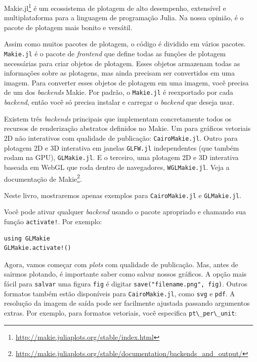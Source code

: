 \documentclass[
  notoc %
]{tufte-book}
\DeclareRobustCommand{\href}[2]{#2\footnote{\url{#1}}}
\newcommand{\passthrough}[1]{#1}
\begin{document}
\href{http://makie.juliaplots.org/stable/index.html}{Makie.jl} é um
ecossistema de plotagem de alto desempenho, extensível e multiplataforma
para a linguagem de programação Julia. Na nossa opinião, é o pacote de
plotagem mais bonito e versátil.

Assim como muitos pacotes de plotagem, o código é dividido em vários
pacotes. \passthrough{\lstinline!Makie.jl!} é o pacote de
\emph{frontend} que define todas as funções de plotagem necessárias para
criar objetos de plotagem. Esses objetos armazenam todas as informações
sobre as plotagens, mas ainda precisam ser convertidos em uma imagem.
Para converter esses objetos de plotagem em uma imagem, você precisa de
um dos \emph{backends} Makie. Por padrão, o
\passthrough{\lstinline!Makie.jl!} é reexportado por cada
\emph{backend}, então você só precisa instalar e carregar o
\emph{backend} que deseja usar.

Existem três \emph{backends} principais que implementam concretamente
todos os recursos de renderização abstratos definidos no Makie. Um para
gráficos vetoriais 2D não interativos com qualidade de publicação:
\passthrough{\lstinline!CairoMakie.jl!}. Outro para plotagem 2D e 3D
interativa em janelas \passthrough{\lstinline!GLFW.jl!} independentes
(que também rodam na GPU), \passthrough{\lstinline!GLMakie.jl!}. E o
terceiro, uma plotagem 2D e 3D interativa baseada em WebGL que roda
dentro de navegadores, \passthrough{\lstinline!WGLMakie.jl!}.
\href{http://makie.juliaplots.org/stable/documentation/backends_and_output/}{Veja
a documentação de Makie}.

Neste livro, mostraremos apenas exemplos para
\passthrough{\lstinline!CairoMakie.jl!} e
\passthrough{\lstinline!GLMakie.jl!}.

Você pode ativar qualquer \emph{backend} usando o pacote apropriado e
chamando sua função \passthrough{\lstinline"activate!"}. Por exemplo:

\begin{lstlisting}
using GLMakie
GLMakie.activate!()
\end{lstlisting}

Agora, vamos começar com \emph{plots} com qualidade de publicação. Mas,
antes de sairmos plotando, é importante saber como salvar nossos
gráficos. A opção mais fácil para \passthrough{\lstinline!salvar!} uma
figura \passthrough{\lstinline!fig!} é digitar
\passthrough{\lstinline!save("filename.png", fig)!}. Outros formatos
também estão disponíveis para \passthrough{\lstinline!CairoMakie.jl!},
como \passthrough{\lstinline!svg!} e \passthrough{\lstinline!pdf!}. A
resolução da imagem de saída pode ser facilmente ajustada passando
argumentos extras. Por exemplo, para formatos vetoriais, você especifica
\passthrough{\lstinline!pt\_per\_unit!}:
\end{document}
